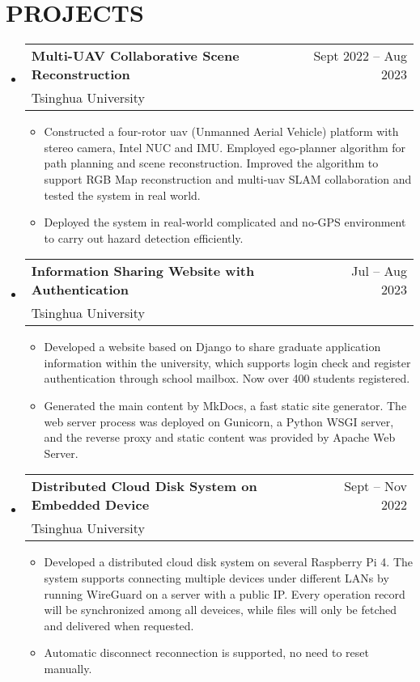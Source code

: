 \documentclass[letterpaper,11pt]{article}
\makeatletter
\newcommand{\resumeItem}[1]{
  \item{
    {#1 \vspace{-3pt}}
  }
}
\newcommand{\resumeSubheading}[4]{
  \vspace{-3pt}\item
    \renewcommand{\arraystretch}{1.0}
    \begin{tabular*}{0.97\textwidth}[t]{l@{\extracolsep{\fill}}r}
      \textbf{#1} & #2 \\
      \textnormal{#3} & \textnormal{#4} \\
    \end{tabular*}\vspace{-8pt}
}
\newcommand{\resumeSubHeadingListStart}{\begin{itemize}[leftmargin=0.15in, label={}]}
\newcommand{\resumeSubHeadingListEnd}{\end{itemize}}
\newcommand{\resumeItemListStart}{\begin{itemize}[leftmargin=11pt]}
\newcommand{\resumeItemListEnd}{\end{itemize}\vspace{-2pt}}
\makeatother
\begin{document}
\section{\textbf{PROJECTS}}
\resumeSubHeadingListStart

\resumeSubheading
        {Multi-UAV  Collaborative Scene Reconstruction}{Sept 2022 -- Aug 2023}
        {Tsinghua University}{}
      \resumeItemListStart
        \small\resumeItem{Constructed a four-rotor uav (Unmanned Aerial Vehicle) platform with stereo camera, Intel NUC and IMU. Employed ego-planner algorithm for path planning and scene reconstruction. Improved the algorithm to support RGB Map reconstruction and multi-uav SLAM collaboration and tested the system in real world.}
        \resumeItem{Deployed the system in real-world complicated and no-GPS environment to carry out hazard detection efficiently.}
    \resumeItemListEnd

\resumeSubheading
        {Information Sharing Website with Authentication}{Jul -- Aug 2023}
        {Tsinghua University}{}
    \resumeItemListStart
        \small
        \resumeItem{Developed a website based on Django to share graduate application information within the university, which supports login check and register authentication through school mailbox. Now over 400 students registered.}
        \resumeItem{Generated the main content by MkDocs, a fast static site generator. The web server process was deployed on Gunicorn, a Python WSGI server, and the reverse proxy and static content was provided by Apache Web Server. }
    \resumeItemListEnd

\resumeSubheading
        {Distributed Cloud Disk System on Embedded Device}{Sept -- Nov 2022}
        {Tsinghua University}{}
    \resumeItemListStart
        \small
        \resumeItem{Developed a distributed cloud disk system on several Raspberry Pi 4. The system supports connecting multiple devices under different LANs by running WireGuard on a server with a public IP. Every operation record will be synchronized among all deveices, while files will only be fetched and delivered when requested.}
        \resumeItem{Automatic disconnect reconnection is supported, no need to reset manually.}
    \resumeItemListEnd

\resumeSubHeadingListEnd
\end{document}
